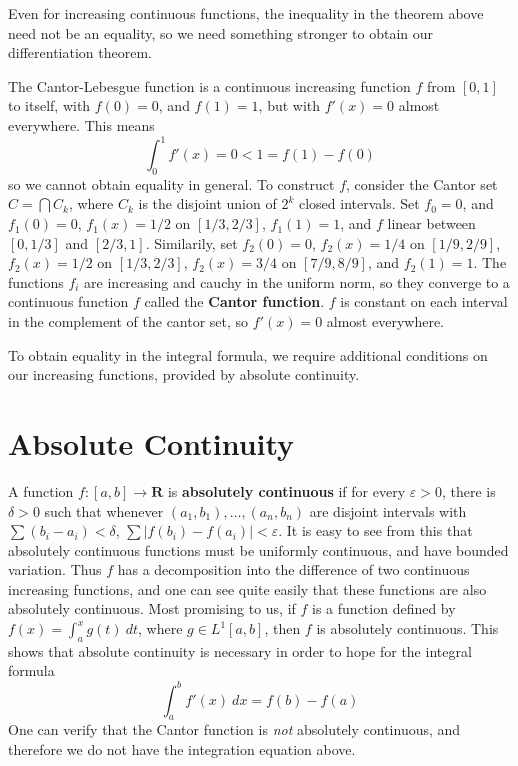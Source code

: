 Even for increasing continuous functions, the inequality in the theorem above need not be an equality, so we need something stronger to obtain our differentiation theorem.

\begin{example}
  The Cantor-Lebesgue function is a continuous increasing function $f$ from $[0,1]$ to itself, with $f(0) = 0$, and $f(1) = 1$, but with $f'(x) = 0$ almost everywhere. This means
  \[ \int_0^1 f'(x) = 0 < 1 = f(1) - f(0) \]
  so we cannot obtain equality in general. To construct $f$, consider the Cantor set $C = \bigcap C_k$, where $C_k$ is the disjoint union of $2^k$ closed intervals. Set $f_0 = 0$, and $f_1(0) = 0$, $f_1(x) = 1/2$ on $[1/3,2/3]$, $f_1(1) = 1$, and $f$ linear between $[0,1/3]$ and $[2/3,1]$. Similarily, set $f_2(0) = 0$, $f_2(x) = 1/4$ on $[1/9, 2/9]$, $f_2(x) = 1/2$ on $[1/3,2/3]$, $f_2(x) = 3/4$ on $[7/9,8/9]$, and $f_2(1) = 1$. The functions $f_i$ are increasing and cauchy in the uniform norm, so they converge to a continuous function $f$ called the {\bf Cantor function}. $f$ is constant on each interval in the complement of the cantor set, so $f'(x) = 0$ almost everywhere.
\end{example}

To obtain equality in the integral formula, we require additional conditions on our increasing functions, provided by absolute continuity.

\section{Absolute Continuity}

A function $f: [a,b] \to \mathbf{R}$ is {\bf absolutely continuous} if for every $\varepsilon > 0$, there is $\delta > 0$ such that whenever $(a_1, b_1), \dots, (a_n,b_n)$ are disjoint intervals with $\sum (b_i - a_i) < \delta$, $\sum |f(b_i) - f(a_i)| < \varepsilon$. It is easy to see from this that absolutely continuous functions must be uniformly continuous, and have bounded variation. Thus $f$ has a decomposition into the difference of two continuous increasing functions, and one can see quite easily that these functions are also absolutely continuous. Most promising to us, if $f$ is a function defined by $f(x) = \int_a^x g(t)\ dt$, where $g \in L^1[a,b]$, then $f$ is absolutely continuous. This shows that absolute continuity is necessary in order to hope for the integral formula
%
\[ \int_a^b f'(x)\ dx = f(b) - f(a) \]
%
One can verify that the Cantor function is {\it not} absolutely continuous, and therefore we do not have the integration equation above.

